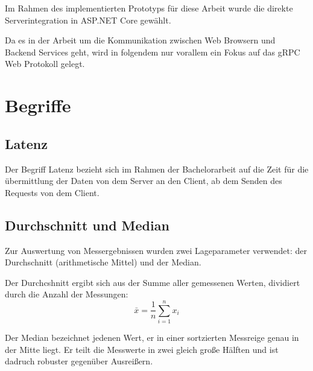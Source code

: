 Im Rahmen des implementierten Prototyps für diese Arbeit wurde die direkte Serverintegration in ASP.NET Core gewählt.

Da es in der Arbeit um die Kommunikation zwischen Web Browsern und Backend Services geht, wird in folgendem nur vorallem ein Fokus auf das gRPC Web Protokoll gelegt.

\clearpage
\section{Begriffe}
\subsection*{Latenz}
Der Begriff Latenz bezieht sich im Rahmen der Bachelorarbeit auf die Zeit für die übermittlung der Daten von dem Server an den Client, ab dem Senden des Requests von dem Client.
\subsection*{Durchschnitt und Median}
Zur Auswertung von Messergebnissen wurden zwei Lageparameter verwendet: der Durchschnitt (arithmetische Mittel) und der Median. 

Der Durchcshnitt ergibt sich aus der Summe aller gemessenen Werten, dividiert durch die Anzahl der Messungen:
\[
\bar{x} = \frac{1}{n} \sum_{i=1}^n x_i
\]

Der Median bezeichnet jedenen Wert, er in einer sortzierten Messreige genau in der Mitte liegt. Er teilt die Messwerte in zwei gleich große Hälften und ist dadruch robuster gegenüber Ausreißern.

\chapterend
